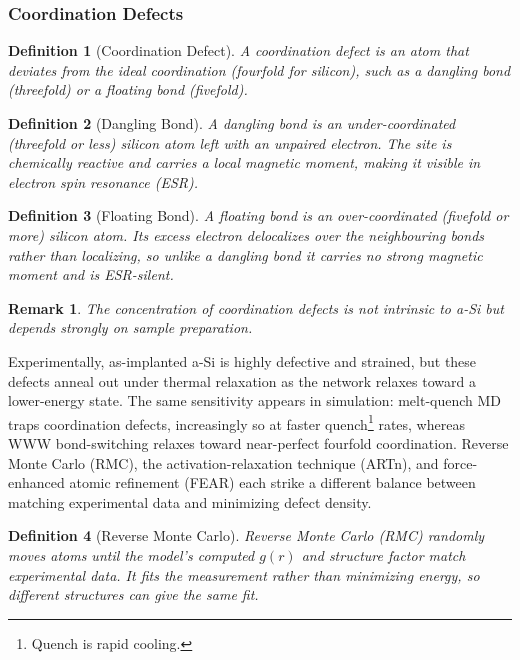 \documentclass{article}
\newtheorem{definition}{Definition}
\newtheorem{remark}{Remark}
\begin{document}
\subsubsection{Coordination Defects}
\begin{definition}[Coordination Defect]
    \label{C.D}
    A coordination defect is an atom that deviates from the ideal coordination (fourfold for silicon), such as a dangling bond (threefold) or a floating bond (fivefold).    
\end{definition}
\begin{definition}[Dangling Bond]
    A dangling bond is an under-coordinated (threefold or less) silicon atom left with an unpaired electron. The site is chemically reactive and carries a local magnetic moment, making it visible in electron spin resonance (ESR).
\end{definition}
\begin{definition}[Floating Bond]
    A floating bond is an over-coordinated (fivefold or more) silicon atom. Its excess electron delocalizes over the neighbouring bonds rather than localizing, so unlike a dangling bond it carries no strong magnetic moment and is ESR-silent.
\end{definition}
\begin{remark}
    The concentration of coordination defects is not intrinsic to a-Si but depends strongly on sample preparation.
\end{remark}
Experimentally, as-implanted a-Si is highly defective and strained, but these defects anneal out under thermal relaxation as the network relaxes toward a lower-energy state. The same sensitivity appears in simulation: melt-quench MD traps coordination defects, increasingly so at faster quench\footnote{Quench is rapid cooling.} rates, whereas WWW bond-switching relaxes toward near-perfect fourfold coordination. Reverse Monte Carlo (RMC), the activation-relaxation technique (ARTn), and force-enhanced atomic refinement (FEAR) each strike a different balance between matching experimental data and minimizing defect density.
\begin{definition}[Reverse Monte Carlo]
    Reverse Monte Carlo (RMC) randomly moves atoms until the model's computed $g(r)$ and structure factor match experimental data. It fits the measurement rather than minimizing energy, so different structures can give the same fit.
\end{definition}
\end{document}
